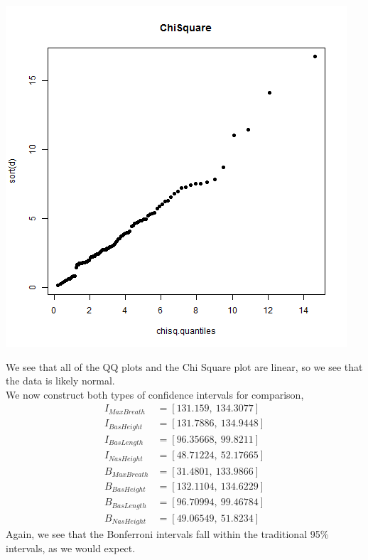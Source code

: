 \documentclass[letterpaper,10pt]{article}
\begin{document}
\begin{description}
\begin{center}
\includegraphics[scale=1]{5Chi.png}
\end{center}
We see that all of the QQ plots and the Chi Square plot are linear, so we see that the data is likely normal.\\
We now construct both types of confidence intervals for comparison,
\begin{align*}
I_{MaxBreath} &= [131.159,\ 134.3077]\\
I_{BasHeight} &= [131.7886,\ 134.9448]\\
I_{BasLength} &= [96.35668,\ 99.8211]\\
I_{NasHeight} &= [48.71224,\ 52.17665]\\
B_{MaxBreath} &=[31.4801,\ 133.9866]\\
B_{BasHeight} &=[132.1104,\ 134.6229]\\
B_{BasLength} &=[96.70994,\ 99.46784]\\
B_{NasHeight} &=[49.06549,\ 51.8234]
\end{align*}
Again, we see that the Bonferroni intervals fall within the traditional 95\% intervals, as we would expect.
\end{description}
\end{document}
